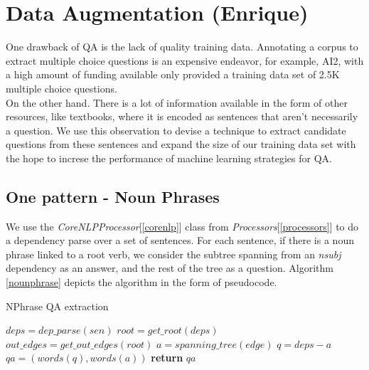 \section{Data Augmentation (Enrique)}

One drawback of QA is the lack of quality training data. Annotating a corpus to extract multiple choice questions is an expensive endeavor, for example, AI2, with a high amount of funding available only provided a training data set of 2.5K multiple choice questions.\\
On the other hand. There is a lot of information available in the form of other resources, like textbooks, where it is encoded as sentences that aren't necessarily a question. We use this observation to devise a technique to extract candidate questions from these sentences and expand the size of our training data set with the hope to increse the performance of machine learning strategies for QA.\\

\subsection{One pattern - Noun Phrases}

We use the \emph{CoreNLPProcessor}[\ref{corenlp}] class from \emph{Processors}[\ref{processors}] to do a dependency parse over a set of sentences. For each sentence, if there is a noun phrase linked to a root verb, we consider the subtree spanning from an \emph{nsubj} dependency as an answer, and the rest of the tree as a question. Algorithm \ref{nounphrase} depicts the algorithm in the form of pseudocode.\\

\begin{algorithm}
\caption{NPhrase QA extraction}\label{nounphrase}
\begin{algorithmic}[1]
   \State $deps = dep\_parse(sen)$
   \State $root = get\_root(deps)$
   \State $out\_edges = get\_out\_edges(root)$
		\State $a = spanning\_tree(edge)$
		\State $q = deps - a$
		\State $qa = (words(q), words(a))$
		\State \textbf{return} $qa$
	\EndIf
   \EndFor
   \EndProcedure
\end{algorithmic}
\end{algorithm}
   
